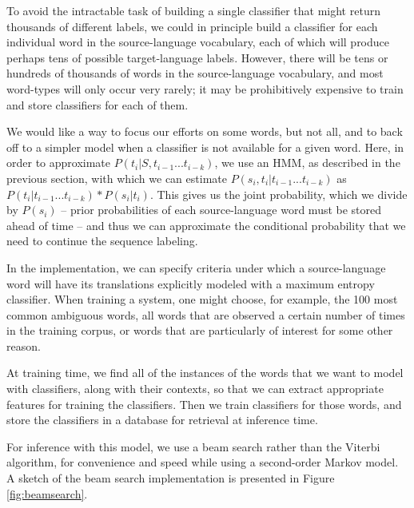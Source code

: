 \documentclass[11pt]{article}
\begin{document}
To avoid the intractable task of building a single classifier that might return
thousands of different labels, we could in principle build a classifier for
each individual word in the source-language vocabulary, each of which will
produce perhaps tens of possible target-language labels. However, there will be
tens or hundreds of thousands of words in the source-language vocabulary, and
most word-types will only occur very rarely; it may be prohibitively expensive
to train and store classifiers for each of them.

We would like a way to focus our efforts on some words, but not all, and to
back off to a simpler model when a classifier is not available for a given
word. Here, in order to approximate $P(t_i | S, t_{i-1}...t_{i-k})$,
we use an HMM, as described in the previous section, with which we can estimate
$P(s_i, t_i | t_{i-1}...t_{i-k})$ as  
$P(t_i | t_{i-1}...t_{i-k}) * P(s_i | t_i)$.
This gives us the joint probability, which we divide by $P(s_i)$
-- prior probabilities of each source-language word must be stored ahead of
time -- and thus we can approximate the conditional probability that we need to
continue the sequence labeling.

In the implementation, we can specify criteria under which a source-language
word will have its translations explicitly modeled with a maximum entropy
classifier. When training a system, one might choose, for example, the 100 most
common ambiguous words, all words that are observed a certain number of times
in the training corpus, or words that are particularly of interest for some
other reason.

At training time, we find all of the instances of the words that we want to
model with classifiers, along with their contexts, so that we can extract
appropriate features for training the classifiers. Then we train classifiers
for those words, and store the classifiers in a database for retrieval at
inference time.

For inference with this model, we use a beam search rather than the Viterbi
algorithm, for convenience and speed while using a second-order Markov model.
A sketch of the beam search implementation is presented in Figure
\ref{fig:beamsearch}.
\end{document}
